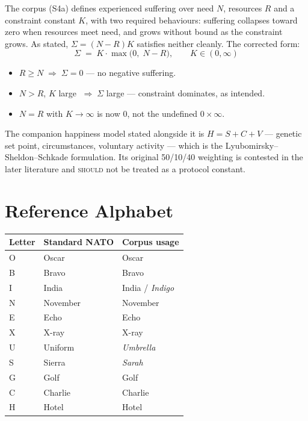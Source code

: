 \documentclass[11pt,a4paper]{article}
\newcommand{\SHOULD}{\textsc{should}}
\begin{document}
The corpus (S4a) defines experienced suffering over need $N$, resources $R$ and
a constraint constant $K$, with two required behaviours: suffering collapses
toward zero when resources meet need, and grows without bound as the constraint
grows. As stated, $\Sigma = (N-R)K$ satisfies neither cleanly. The corrected
form:
\[
\Sigma \;=\; K \cdot \max\bigl(0,\; N - R\bigr), \qquad K \in (0, \infty)
\]
\begin{itemize}[leftmargin=*,noitemsep]
  \item $R \geq N \;\Rightarrow\; \Sigma = 0$ --- no negative suffering.
  \item $N > R$, $K$ large $\;\Rightarrow\; \Sigma$ large --- constraint
    dominates, as intended.
  \item $N = R$ with $K \to \infty$ is now $0$, not the undefined
    $0 \times \infty$.
\end{itemize}

The companion happiness model stated alongside it is
$H = S + C + V$ --- genetic set point, circumstances, voluntary activity ---
which is the Lyubomirsky--Sheldon--Schkade formulation. Its original 50/10/40
weighting is contested in the later literature and \SHOULD{} not be treated as
a protocol constant.

\section{Reference Alphabet}

\begin{center}
\begin{tabular}{@{}lll@{}}
\toprule
\textbf{Letter} & \textbf{Standard NATO} & \textbf{Corpus usage} \\
\midrule
O & Oscar & Oscar \\
B & Bravo & Bravo \\
I & India & India / \emph{Indigo} \\
N & November & November \\
E & Echo & Echo \\
X & X-ray & X-ray \\
U & Uniform & \emph{Umbrella} \\
S & Sierra & \emph{Sarah} \\
G & Golf & Golf \\
C & Charlie & Charlie \\
H & Hotel & Hotel \\
\bottomrule
\end{tabular}
\end{center}
\end{document}
